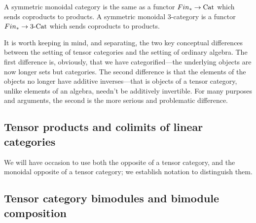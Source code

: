 \documentclass{amsart}
\begin{document}

A symmetric monoidal category is the same as a functor $Fin_* \to \mathrm{Cat}$ which sends coproducts to products. A symmetric monoidal 3-category is a functor $Fin_* \to 3\text{-}\mathrm{Cat}$ which sends coproducts to products.



\begin{remark}
It is worth keeping in mind, and separating, the two key conceptual differences between the setting of tensor categories and the setting of ordinary algebra.  The first difference is, obviously, that we have categorified---the underlying objects are now longer sets but categories.  The second difference is that the elements of the objects no longer have additive inverses---that is objects of a tensor category, unlike elements of an algebra, needn't be additively invertible.  For many purposes and arguments, the second is the more serious and problematic difference.
\end{remark}



\subsection{Tensor products and colimits of linear categories} \label{sec-tc-tensorprod}

\begin{definition}
\end{definition}

\begin{definition} \label{def-colim}
\end{definition}


We will have occasion to use both the opposite of a tensor category, and the monoidal opposite of a tensor category; we establish notation to distinguish them.  

\subsection{Tensor category bimodules and bimodule composition} \label{sec-tc-bimod}
\end{document}
